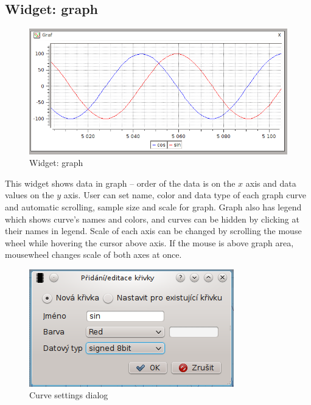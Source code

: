 \documentclass[12pt, a4paper, oneside]{article}
\begin{document}
\subsection{Widget: graph}
\begin{figure}[h]
\begin{center}
\includegraphics[scale=0.65]{img/w_graph.png}
\caption{Widget: graph}
\end{center}
\end{figure}
This widget shows data in graph -- order of the data is on the $x$ axis and data values on the $y$ axis. User can set name, color and data type of each graph curve and automatic scrolling, sample size and scale for graph. Graph also has legend which shows curve's names and colors, and curves can be hidden by clicking at their names in legend. Scale of each axis can be changed by scrolling the mouse wheel while hovering the cursor above axis. If the mouse is above graph area, mousewheel changes scale of both axes at once.
\begin{figure}[h]
\begin{center}
\includegraphics[scale=0.8]{img/w_graph_add.png}
\caption{Curve settings dialog}
\end{center}
\end{figure}
\end{document}
